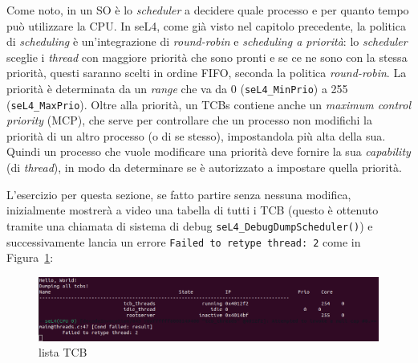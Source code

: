Come noto, in un SO è lo \textit{scheduler} a decidere quale processo e per quanto tempo può utilizzare la CPU. In seL4, come già visto nel capitolo precedente, la politica di \textit{scheduling} è un'integrazione di \textit{round-robin} e \textit{scheduling a priorità}: lo \textit{scheduler} sceglie i \textit{thread} con maggiore priorità che sono pronti e se ce ne sono con la stessa priorità, questi saranno scelti in ordine FIFO, seconda la politica \textit{round-robin}. La priorità è determinata da un \textit{range} che va da 0 (\texttt{seL4\_MinPrio}) a 255 (\texttt{seL4\_MaxPrio}). Oltre alla priorità, un TCBs contiene anche un \textit{maximum control priority} (MCP), che serve per controllare che un processo non modifichi la priorità di un altro processo (o di se stesso), impostandola più alta della sua. Quindi un processo che vuole modificare una priorità deve fornire la sua \textit{capability} (di \textit{thread}), in modo da determinare se è autorizzato a impostare quella priorità.

L'esercizio per questa sezione, se fatto partire senza nessuna modifica, inizialmente mostrerà a video una tabella di tutti i TCB (questo è ottenuto tramite una chiamata di sistema di debug \texttt{seL4\_DebugDumpScheduler()}) e successivamente lancia un errore \texttt{Failed to retype thread: 2} come in Figura~\ref{fig:TutorialThreads}:\\
\begin{figure}[h]
  \includegraphics[width=\linewidth]{img/Threads.png}
  \caption{lista TCB}
  \label{fig:TutorialThreads}
\end{figure}

